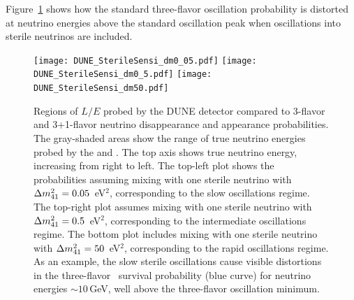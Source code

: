 Figure~\ref{fig:regimes} shows how the standard three-flavor oscillation probability is distorted at neutrino energies above the standard oscillation peak when oscillations into sterile neutrinos are included.
\begin{figure}[!htb]
	\begin{center}
	  	\texttt{[image: DUNE\_SterileSensi\_dm0\_05.pdf]}
        \texttt{[image: DUNE\_SterileSensi\_dm0\_5.pdf]}
        \texttt{[image: DUNE\_SterileSensi\_dm50.pdf]}
	\end{center}
\caption[Regions of $L/E$ probed by DUNE for %
3-flavor and 3+1-flavor $\nu$ oscillations]
{Regions of $L/E$ probed by the DUNE detector compared to 3-flavor and 3+1-flavor neutrino disappearance and appearance probabilities. The gray-shaded areas show the range of true neutrino energies probed by the  and . The top axis shows true neutrino energy, increasing from right to left. The top-left plot shows the probabilities assuming mixing with one sterile neutrino with $\Delta m^2_{\rm{41}}=0.05$~eV$^2$, corresponding to the slow oscillations regime. The top-right plot assumes mixing with one sterile neutrino with $\Delta m^2_{\rm{41}}=0.5$~eV$^2$, corresponding to the intermediate oscillations regime. The bottom plot includes mixing with one sterile neutrino with $\Delta m^2_{\rm{41}}=50$~eV$^2$, corresponding to the rapid oscillations regime. As an example, the slow sterile oscillations cause visible distortions in the three-flavor \numu~survival probability (blue curve) for neutrino energies $\sim10$\,GeV, well above the three-flavor oscillation minimum.}
\label{fig:regimes}
\end{figure}

